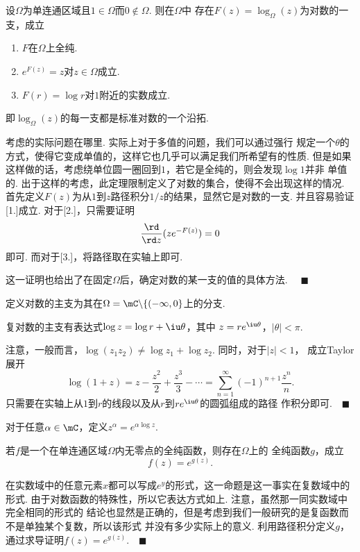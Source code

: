   \begin{thm}
    \label{thm: 复对数}
    设$\Omega$为单连通区域且$1\in\Omega$而$0\notin\Omega$. 则在$\Omega$中
    存在$F(z)=\log_{\Omega}(z)$为对数的一支，成立
    \begin{enumerate}
      \item $F$在$\Omega$上全纯.
      \item $e^{F(z)}=z$对$z\in\Omega$成立.
      \item $F(r)=\log r$对$1$附近的实数成立.
    \end{enumerate}
    即$\log_\Omega(z)$的每一支都是标准对数的一个沿拓.
  \end{thm}
  \remark
    考虑的实际问题在哪里. 实际上对于多值的问题，我们可以通过强行
    规定一个$\theta$的方式，使得它变成单值的，这样它也几乎可以满足我们所希望有的性质. 
    但是如果这样做的话，考虑绕单位圆一圈回到$1$，若它是全纯的，则会发现$\log 1$并非
    单值的. 出于这样的考虑，此定理限制定义了对数的集合，使得不会出现这样的情况.
  \proof
    首先定义$F(z)$为从$1$到$z$路径积分$1/z$的结果，显然它是对数的一支. 并且容易验证
    [1.]成立. 对于[2.]，只需要证明
    \[
      \frac{\rd}{\rd z}(ze^{-F(z)}) = 0
    \]
    即可. 而对于[3.]，将路径取在实轴上即可.\par
    这一证明也给出了在固定$\Omega$后，确定对数的某一支的值的具体方法. $\quad\blacksquare$

  \begin{defi}[主支]
    \label{defi: 复对数主支}
    定义对数的主支为其在$\Omega = \mC\backslash\{(-\infty, 0\}$上的分支.
  \end{defi}

  \begin{thm}[主支]
    复对数的主支有表达式$\log z = \log r + \iu\theta$，其中
    $z=re^{\iu\theta}$，$|\theta|<\pi$.
  \end{thm}
  \remark
    注意，一般而言，$\log(z_1z_2)\ne \log z_1 + \log z_2$. 同时，对于$|z|<1$，
    成立Taylor展开
    \[
      \log(1+z) = z-\frac{z^2}{2}+\frac{z^3}{3} - \cdots = 
      \sum_{n=1}^\infty (-1)^{n+1}\frac{z^n}{n}.
    \]
  \proof
    只需要在实轴上从$1$到$r$的线段以及从$r$到$re^{\iu\theta}$的圆弧组成的路径
    作积分即可.$\quad\blacksquare$

  \begin{defi}[指数]
    对于任意$\alpha\in\mC$，定义$z^\alpha = e^{\alpha\log z}$.
  \end{defi}

  \begin{thm}
    若$f$是一个在单连通区域$\Omega$内无零点的全纯函数，则存在$\Omega$上的
    全纯函数$g$，成立
    \[
      f(z) = e^{g(z)}.
    \]
  \end{thm}
  \remark
    在实数域中的任意元素$x$都可以写成$e^y$的形式，这一命题是这一事实在复数域中的形式.
    由于对数函数的特殊性，所以它表达方式如上. 注意，虽然那一同实数域中完全相同的形式的
    结论也显然是正确的，但是考虑到我们一般研究的是复函数而不是单独某个复数，所以该形式
    并没有多少实际上的意义.
  \proof
    利用路径积分定义$g$，通过求导证明$f(z)=e^{g(z)}$.$\quad\blacksquare$


